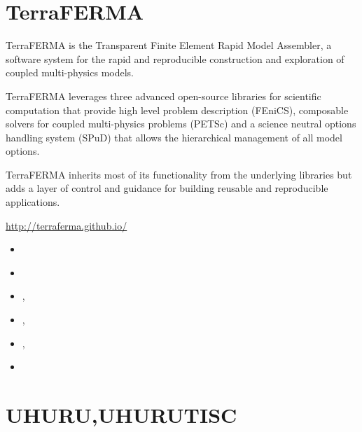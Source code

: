 \section{TerraFERMA} 
TerraFERMA is the Transparent Finite Element Rapid Model Assembler, a software 
system for the rapid and reproducible construction and exploration of coupled multi-physics models.

TerraFERMA leverages three advanced open-source libraries for scientific computation that 
provide high level problem description (FEniCS), composable solvers for coupled multi-physics 
problems (PETSc) and a science neutral options handling system (SPuD) that allows the hierarchical 
management of all model options.

TerraFERMA inherits most of its functionality from the underlying libraries but adds a layer of 
control and guidance for building reusable and reproducible applications.

\url{http://terraferma.github.io/}

\begin{small}
\begin{itemize}
\item[\twothousandfourteen]  \textcite{wisv14}
\item[\twothousandsixteen]   \textcite{spmw16}
\item[\twothousandseventeen] \textcite{wisv17}, \textcite{ceww17}
\item[\twothousandnineteen]  \textcite{ceww19}, \textcite{perr19}
\item[\twothousandtwenty]    \textcite{siss20}, \textcite{abvw20}
\item[\twothousandtwentytwo] \textcite{ceap22}
\end{itemize}
\end{small}





\section{UHURU,UHURUTISC} 

